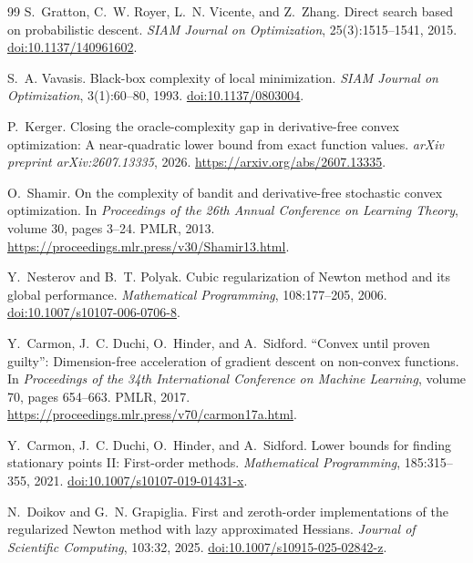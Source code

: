 \documentclass[11pt]{article}
\numberwithin{equation}{section}
\theoremstyle{definition}
\theoremstyle{remark}
\begin{document}
\begin{thebibliography}{99}
S.~Gratton, C.~W. Royer, L.~N. Vicente, and Z.~Zhang.
\newblock Direct search based on probabilistic descent.
\newblock \emph{SIAM Journal on Optimization}, 25(3):1515--1541, 2015.
\newblock \href{https://doi.org/10.1137/140961602}{doi:10.1137/140961602}.

S.~A. Vavasis.
\newblock Black-box complexity of local minimization.
\newblock \emph{SIAM Journal on Optimization}, 3(1):60--80, 1993.
\newblock \href{https://doi.org/10.1137/0803004}{doi:10.1137/0803004}.

P.~Kerger.
\newblock Closing the oracle-complexity gap in derivative-free convex optimization: A near-quadratic lower bound from exact function values.
\newblock \emph{arXiv preprint arXiv:2607.13335}, 2026.
\newblock \url{https://arxiv.org/abs/2607.13335}.

O.~Shamir.
\newblock On the complexity of bandit and derivative-free stochastic convex optimization.
\newblock In \emph{Proceedings of the 26th Annual Conference on Learning Theory}, volume 30, pages 3--24. PMLR, 2013.
\newblock \url{https://proceedings.mlr.press/v30/Shamir13.html}.

Y.~Nesterov and B.~T. Polyak.
\newblock Cubic regularization of Newton method and its global performance.
\newblock \emph{Mathematical Programming}, 108:177--205, 2006.
\newblock \href{https://doi.org/10.1007/s10107-006-0706-8}{doi:10.1007/s10107-006-0706-8}.

Y.~Carmon, J.~C. Duchi, O.~Hinder, and A.~Sidford.
\newblock ``Convex until proven guilty'': Dimension-free acceleration of gradient descent on non-convex functions.
\newblock In \emph{Proceedings of the 34th International Conference on Machine Learning}, volume 70, pages 654--663. PMLR, 2017.
\newblock \url{https://proceedings.mlr.press/v70/carmon17a.html}.

Y.~Carmon, J.~C. Duchi, O.~Hinder, and A.~Sidford.
\newblock Lower bounds for finding stationary points II: First-order methods.
\newblock \emph{Mathematical Programming}, 185:315--355, 2021.
\newblock \href{https://doi.org/10.1007/s10107-019-01431-x}{doi:10.1007/s10107-019-01431-x}.

N.~Doikov and G.~N. Grapiglia.
\newblock First and zeroth-order implementations of the regularized Newton method with lazy approximated Hessians.
\newblock \emph{Journal of Scientific Computing}, 103:32, 2025.
\newblock \href{https://doi.org/10.1007/s10915-025-02842-z}{doi:10.1007/s10915-025-02842-z}.


\end{thebibliography}
\end{document}
